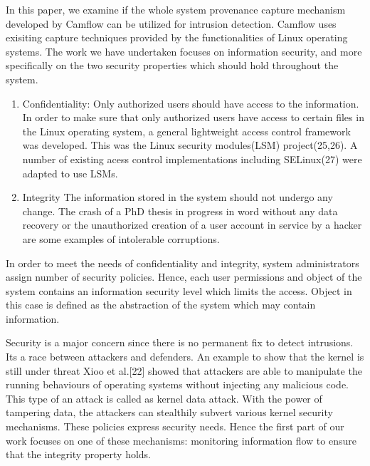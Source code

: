 \label{What are we doing?}
In this paper, we examine if the whole system provenance capture mechanism developed by Camflow can be utilized for intrusion detection. Camflow uses exisiting capture techniques provided by the functionalities of Linux operating systems. The work we have undertaken focuses on information security, and more specifically on the two security properties which should hold throughout the system. 
\vskip 0.1in
\begin{enumerate}
	\item  Confidentiality: Only authorized users should have access to the information. In order to make sure that only authorized users have access to certain files in the Linux operating system, a general lightweight access control framework was developed. This was the Linux security modules(LSM) project(25,26). A number of existing acess control implementations including SELinux(27) were adapted to use LSMs.
	\vskip 0.1in
	\item Integrity The information stored in the system should not undergo any change. The crash of a PhD thesis in progress in word without any data recovery or the unauthorized creation of a user account in service by a hacker are some examples of intolerable corruptions. 
\end{enumerate}
\vskip 0.1in
In order to meet the needs of confidentiality and integrity, system administrators assign number of security policies. Hence, each user permissions and object of the system contains an information security level which limits the access. Object in this case is defined as the abstraction of the system which may contain information. 

%
\label{Role of data povenance in security}

Security is a major concern since there is no permanent fix to detect intrusions. Its a race between attackers and defenders.
An example to show that the kernel is still under threat Xioo et al.[22] showed that attackers are able to manipulate the running behaviours of operating systems without injecting any malicious code. This type of an attack is called as kernel data attack. With the power of tampering data, the attackers can stealthily subvert various kernel security mechanisms. These policies express security needs. Hence the first part of our work focuses on one of these mechanisms: monitoring information flow to ensure that the integrity property holds. 
\vskip 0.1in
\label{Challenge 1}

